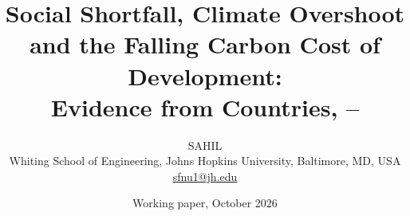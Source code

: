 \documentclass[11pt]{article}
\title{\vspace{-1.5em}\textbf{Social Shortfall, Climate Overshoot and the Falling Carbon Cost of Development:\\ Evidence from \nNCons{} Countries, \nFirstYear--\nLastYear}}
\author{SAHIL\\[2pt]
\small Whiting School of Engineering, Johns Hopkins University, Baltimore, MD, USA\\
\small \href{mailto:sfnu1@jh.edu}{sfnu1@jh.edu}}
\date{\small Working paper, October 2026}
\begin{document}
\maketitle
\thispagestyle{empty}



\clearpage
\tableofcontents
\clearpage













\clearpage
\appendix
\renewcommand{\thetable}{A\arabic{table}}
\renewcommand{\thefigure}{A\arabic{figure}}
\setcounter{table}{0}
\setcounter{figure}{0}

\end{document}
